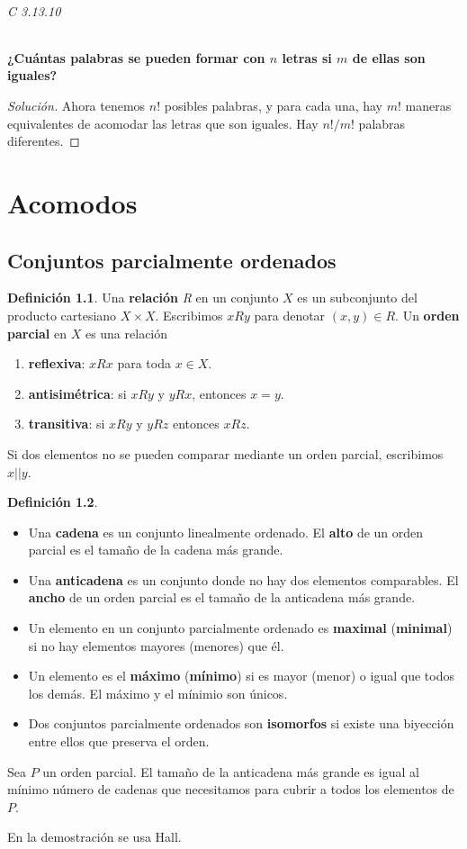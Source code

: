 \documentclass[spanish]{book}
\theoremstyle{definition}
\newtheorem*{defn}{Definición}
\begin{document}
\paragraph{C 3.13.10} \textbf{¿Cuántas palabras se pueden formar con $n$ letras si $m$ de ellas son iguales?}
\begin{proof}[Solución]
	Ahora tenemos $n!$ posibles palabras, y para cada una, hay $m!$ maneras equivalentes de acomodar las letras que son iguales. Hay $n!/m!$ palabras diferentes.
\end{proof}
\part{Acomodos}
\chapter{Conjuntos parcialmente ordenados}
\begin{defn}
	Una \textbf{relación} \textit{R} en un conjunto $X$ es un subconjunto del producto cartesiano $X\times X$. Escribimos $xRy$ para denotar $(x,y)\in R$. Un \textbf{orden parcial} en $X$ es una relación
	\begin{enumerate}
		\item[] \textbf{reflexiva}: $xRx$ para toda $x\in X$.
		\item[] \textbf{antisimétrica}: si  $xRy$ y $yRx$, entonces $x=y$.
		\item[] \textbf{transitiva}: si $xRy$ y $yRz$ entonces $xRz$.
	\end{enumerate}
	Si dos elementos no se pueden comparar mediante un orden parcial, escribimos $x||y$.
\end{defn}
\begin{defn}\leavevmode
	\begin{itemize}
		\item 	Una \textbf{cadena} es un conjunto linealmente ordenado. El \textbf{alto} de un orden parcial es el tamaño de la cadena más grande.
		\item Una \textbf{anticadena} es un conjunto donde no hay dos elementos comparables. El \textbf{ancho} de un orden parcial es el tamaño de la anticadena más grande.
		\item Un elemento en un conjunto parcialmente ordenado es \textbf{maximal} (\textbf{minimal}) si no hay elementos mayores (menores) que él.
		\item Un elemento es el \textbf{máximo} (\textbf{mínimo}) si es mayor (menor) o igual que todos los demás. El máximo y el mínimio son únicos.
		\item Dos conjuntos parcialmente ordenados son \textbf{isomorfos} si existe una biyección entre ellos que preserva el orden.
	\end{itemize}
\end{defn}
\begin{teo}[Dilworth, 1950]
	Sea $P$ un orden parcial. El tamaño de la anticadena más grande es igual al mínimo número de cadenas que necesitamos para cubrir a todos los elementos de $P$.
\end{teo}
En la demostración se usa Hall.
\end{document}
